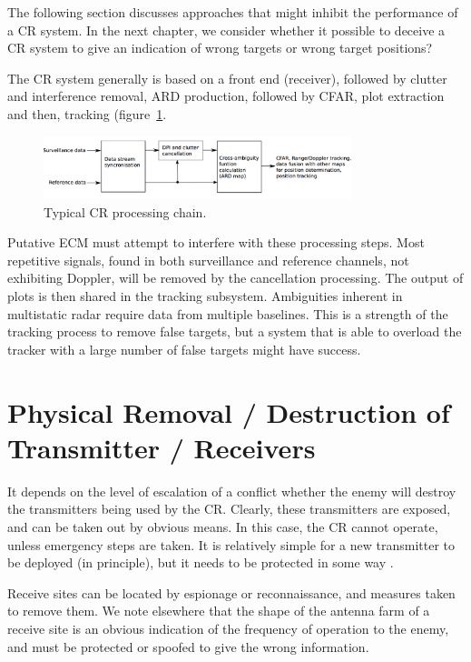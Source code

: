 \documentclass[english, 12pt]{report}
\begin{document}
The following section discusses approaches that might inhibit the performance of  a CR system. In the next chapter, we consider whether it possible to deceive a CR system to give an indication of wrong targets or wrong target positions?  

The CR system generally is based on a front end (receiver), followed by clutter and interference removal, ARD production, followed by CFAR, plot extraction and then, tracking (figure~\ref{fig:procChain}.

\begin{figure}[htbp]
\begin{center}
\includegraphics[width=0.8\textwidth, angle=0]{figs/processingChain.png}
\caption{Typical CR processing chain.}
\label{fig:procChain}
\end{center}
\end{figure}

Putative ECM must attempt to interfere with these processing steps. Most repetitive signals, found in both surveillance and reference channels, not exhibiting Doppler, will be removed by the cancellation processing. The output of plots is then shared in the tracking subsystem. Ambiguities inherent in multistatic radar require data from multiple baselines. This is a strength of the tracking process to remove false targets, but a system that is able to overload the tracker with a large number of false targets might have success.

\section{Physical Removal / Destruction of Transmitter / Receivers}

It depends on the level of escalation of a conflict whether the enemy will destroy the transmitters being used by the CR. Clearly, these transmitters are exposed, and can be taken out by obvious means. In this case, the CR cannot operate, unless emergency steps are taken. It is relatively simple for a new transmitter to be deployed (in principle), but it needs to be protected in some way \cite{doh}.

Receive sites can be located by espionage or reconnaissance, and measures taken to remove them. We note elsewhere that the shape of the antenna farm of a receive site is an obvious indication of the frequency of operation to the enemy, and must be protected or spoofed to give the wrong information.
\end{document}
